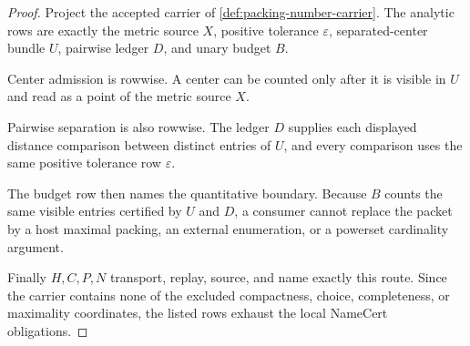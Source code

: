 \begin{proof}
Project the accepted carrier of \autoref{def:packing-number-carrier}. The analytic rows are exactly the metric source $X$, positive tolerance $\varepsilon$, separated-center bundle $U$, pairwise ledger $D$, and unary budget $B$.

Center admission is rowwise. A center can be counted only after it is visible in $U$ and read as a point of the metric source $X$.

Pairwise separation is also rowwise. The ledger $D$ supplies each displayed distance comparison between distinct entries of $U$, and every comparison uses the same positive tolerance row $\varepsilon$.

The budget row then names the quantitative boundary. Because $B$ counts the same visible entries certified by $U$ and $D$, a consumer cannot replace the packet by a host maximal packing, an external enumeration, or a powerset cardinality argument.

Finally $H,C,P,N$ transport, replay, source, and name exactly this route. Since the carrier contains none of the excluded compactness, choice, completeness, or maximality coordinates, the listed rows exhaust the local NameCert obligations.
\end{proof}

